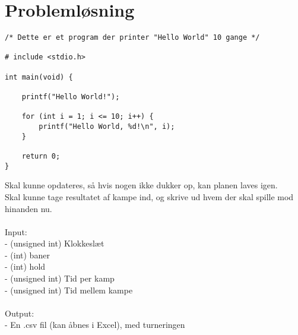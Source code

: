 \chapter{Problemløsning}\label{ch:chlabel}


\begin{verbatim}
/* Dette er et program der printer "Hello World" 10 gange */

# include <stdio.h>

int main(void) {
    
    printf("Hello World!");
    
    for (int i = 1; i <= 10; i++) {
        printf("Hello World, %d!\n", i);
    }
    
    return 0;
}
\end{verbatim}

Skal kunne opdateres, så hvis nogen ikke dukker op, kan planen laves igen.\\
Skal kunne tage resultatet af kampe ind, og skrive ud hvem der skal spille mod hinanden nu.
\\
\\
Input:\\
 - (unsigned int) Klokkeslæt\\
 - (int) baner\\
 - (int) hold\\
 - (unsigned int) Tid per kamp\\
 - (unsigned int) Tid mellem kampe\\ 
 \\
 Output: \\
  - En .csv fil (kan åbnes i Excel), med turneringen
 
